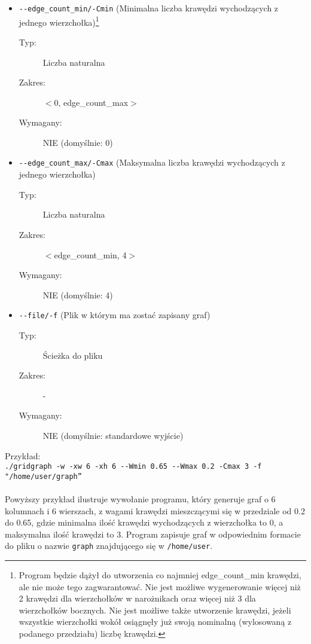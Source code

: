 \documentclass[11pt,a4paper]{report}
\begin{document}
\begin{itemize}
\begin{description}
            \item[Zakres:] $<$edge\_weight\_min, 1$>$
            \item[Wymagany:] NIE (domyślnie: 1)
        \end{description}
        \item \verb|--edge_count_min/-Cmin| (Minimalna liczba krawędzi wychodzących z jednego wierzchołka)\footnote{Program będzie dążył do utworzenia co najmniej edge\_count\_min krawędzi, ale nie może tego zagwarantować. Nie jest możliwe wygenerowanie więcej niż 2 krawędzi dla wierzchołków w narożnikach oraz więcej niż 3 dla wierzchołków bocznych. Nie jest możliwe także utworzenie krawędzi, jeżeli wszystkie wierzchołki wokół osiągnęły już swoją nominalną (wylosowaną z podanego przedziału) liczbę krawędzi.}
        \begin{description}
            \item[Typ:] Liczba naturalna
            \item[Zakres:] $<$0, edge\_count\_max$>$
            \item[Wymagany:] NIE (domyślnie: 0)
        \end{description}
        \item \verb|--edge_count_max/-Cmax| (Maksymalna liczba krawędzi wychodzących z jednego wierzchołka)
        \begin{description}
            \item[Typ:] Liczba naturalna
            \item[Zakres:] $<$edge\_count\_min, 4$>$
            \item[Wymagany:] NIE (domyślnie: 4)
        \end{description}
        \item \verb|--file/-f| (Plik w którym ma zostać zapisany graf)
        \begin{description}
            \item[Typ:] Ścieżka do pliku
            \item[Zakres:] -
            \item[Wymagany:] NIE (domyślnie: standardowe wyjście)
        \end{description}
    \end{itemize}
    Przykład:\\
    \verb|./gridgraph -w -xw 6 -xh 6 --Wmin 0.65 --Wmax 0.2 -Cmax 3 -f "/home/user/graph”|
    \\
    \\
    Powyższy przykład ilustruje wywołanie programu, który generuje graf o 6 kolumnach i 6 wierszach, z wagami krawędzi mieszczącymi się w przedziale od 0.2 do 0.65, gdzie minimalna ilość krawędzi wychodzących z wierzchołka to 0, a maksymalna ilość krawędzi to 3. Program zapisuje graf w odpowiednim formacie do pliku o nazwie \verb|graph| znajdującego się w \verb|/home/user|.
\end{document}
